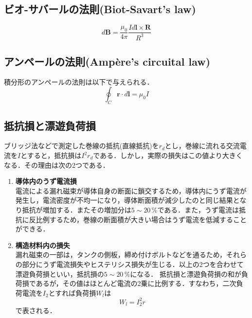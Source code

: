 \subsection{ビオ-サバールの法則(Biot-Savart's law)\cite{1130282271626280192}}
\begin{equation}
	d\boldsymbol{B}=\frac{\mu_{0}}{4\pi}\frac{Id\boldsymbol{l}\times \boldsymbol{R}}{R^{3}}
\end{equation}

\subsection{アンペールの法則(Ampère's circuital law) \cite{12}}
積分形のアンペールの法則は以下で与えられる．
\begin{equation}
	\oint_{C} \boldsymbol{\boldsymbol{r}}\cdot d\boldsymbol{l}=\mu_{0}I
\end{equation}

\subsection{抵抗損と漂遊負荷損\cite{1130282271832577152}}
ブリッジ法などで測定した巻線の抵抗(直線抵抗)を$r_{d}$とし，巻線に流れる交流電流を$I$とすると，抵抗損は$I^{2}r_{d}$である．しかし，実際の損失はこの値より大きくなる．その理由は次の2つである．
\begin{enumerate}[(1)]
	\item \textbf{導体内のうず電流損}\\
	電流による漏れ磁束が導体自身の断面に鎖交するため，導体内にうず電流が発生し，電流密度が不均一になり，導体断面積が減少したのと同じ結果となり抵抗が増加する．またその増加分は$5 \sim 20\,\%$である．また，うず電流は抵抗に反比例するため，巻線の断面積が大きい場合はうず電流を低減することができる\cite{11302822718325772}\cite{1130282270467697152}．
	\item \textbf{構造材料内の損失}\\
	漏れ磁束の一部は，タンクの側板，締め付けボルトなどを通るため，それらの部分にうず電流損失やヒステリシス損失が生じる．以上の2つを合わせて漂遊負荷損といい，抵抗損の$5 \sim 20\,\%$になる．
	抵抗損と漂遊負荷損の和が負荷損であるが，その値はほとんど電流の2乗に比例する．すなわち，二次負荷電流を$I_{2}$とすれば負荷損$W_{l}$は
	\begin{equation}
		W_{l}=I_{2}^{2}r
	\end{equation}
	で表される．
\end{enumerate}

